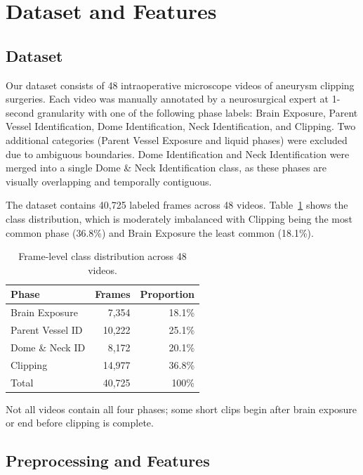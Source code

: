 \documentclass[10pt,twocolumn]{article}
\begin{document}
\section{Dataset and Features}

\subsection{Dataset}

Our dataset consists of 48 intraoperative microscope videos of aneurysm clipping surgeries. Each video was manually annotated by a neurosurgical expert at 1-second granularity with one of the following phase labels: Brain Exposure, Parent Vessel Identification, Dome Identification, Neck Identification, and Clipping. Two additional categories (Parent Vessel Exposure and liquid phases) were excluded due to ambiguous boundaries. Dome Identification and Neck Identification were merged into a single Dome \& Neck Identification class, as these phases are visually overlapping and temporally contiguous.

The dataset contains 40,725 labeled frames across 48 videos. Table~\ref{tab:class_dist} shows the class distribution, which is moderately imbalanced with Clipping being the most common phase (36.8\%) and Brain Exposure the least common (18.1\%).

\begin{table}[h]
\centering
\small
\begin{tabular}{lrr}
\toprule
Phase & Frames & Proportion \\
\midrule
Brain Exposure         & 7,354  & 18.1\% \\
Parent Vessel ID       & 10,222 & 25.1\% \\
Dome \& Neck ID        & 8,172  & 20.1\% \\
Clipping               & 14,977 & 36.8\% \\
\midrule
Total                  & 40,725 & 100\% \\
\bottomrule
\end{tabular}
\caption{Frame-level class distribution across 48 videos.}
\label{tab:class_dist}
\end{table}

Not all videos contain all four phases; some short clips begin after brain exposure or end before clipping is complete.

\subsection{Preprocessing and Features}
\end{document}

